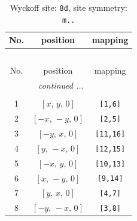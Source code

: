 \documentclass[fleqn,8pt]{jsarticle}
\begin{document}
\renewcommand{\arraystretch}{1.2}
\begin{longtable}{ccc}
\caption{Wyckoff site: {\tt 8d}, site symmetry: {\tt m..}}
 \\
 \hline \hline
No. & position & mapping \\ \hline \endfirsthead

\multicolumn{2}{l}{\tablename\ \thetable{}} \\
 \hline \hline
No. & position & mapping \\ \hline \endhead

 \hline \hline
\multicolumn{2}{r}{\footnotesize\it continued ...} \\ \endfoot

 \hline \hline
\multicolumn{2}{r}{} \\ \endlastfoot

1 & $\left[ x,\, y,\, 0 \right]$ & {\tt [1,6]} \\ \hline
2 & $\left[ - x,\, - y,\, 0 \right]$ & {\tt [2,5]} \\ \hline
3 & $\left[ - y,\, x,\, 0 \right]$ & {\tt [11,16]} \\ \hline
4 & $\left[ y,\, - x,\, 0 \right]$ & {\tt [12,15]} \\ \hline
5 & $\left[ - x,\, y,\, 0 \right]$ & {\tt [10,13]} \\ \hline
6 & $\left[ x,\, - y,\, 0 \right]$ & {\tt [9,14]} \\ \hline
7 & $\left[ y,\, x,\, 0 \right]$ & {\tt [4,7]} \\ \hline
8 & $\left[ - y,\, - x,\, 0 \right]$ & {\tt [3,8]} \\
\end{longtable}
\renewcommand{\arraystretch}{1.2}
\end{document}
